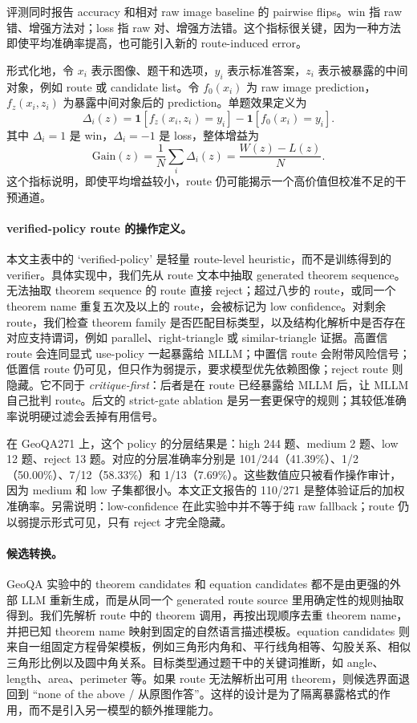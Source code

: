 \documentclass[UTF8,11pt,fontset=fandol]{ctexart}
\begin{document}
评测同时报告 accuracy 和相对 raw image baseline 的 pairwise flips。win 指 raw 错、增强方法对；loss 指 raw 对、增强方法错。这个指标很关键，因为一种方法即使平均准确率提高，也可能引入新的 route-induced error。

形式化地，令 \(x_i\) 表示图像、题干和选项，\(y_i\) 表示标准答案，\(z_i\) 表示被暴露的中间对象，例如 route 或 candidate list。令 \(f_0(x_i)\) 为 raw image prediction，\(f_z(x_i,z_i)\) 为暴露中间对象后的 prediction。单题效果定义为
\begin{equation}
\Delta_i(z)=
\mathbf{1}[f_z(x_i,z_i)=y_i]-
\mathbf{1}[f_0(x_i)=y_i].
\end{equation}
其中 \(\Delta_i=1\) 是 win，\(\Delta_i=-1\) 是 loss，整体增益为
\begin{equation}
\mathrm{Gain}(z)=\frac{1}{N}\sum_i \Delta_i(z)=\frac{W(z)-L(z)}{N}.
\end{equation}
这个指标说明，即使平均增益较小，route 仍可能揭示一个高价值但校准不足的干预通道。

\paragraph{verified-policy route 的操作定义。}
本文主表中的 `verified-policy' 是轻量 route-level heuristic，而不是训练得到的 verifier。具体实现中，我们先从 route 文本中抽取 generated theorem sequence。无法抽取 theorem sequence 的 route 直接 reject；超过八步的 route，或同一个 theorem name 重复五次及以上的 route，会被标记为 low confidence。对剩余 route，我们检查 theorem family 是否匹配目标类型，以及结构化解析中是否存在对应支持谓词，例如 parallel、right-triangle 或 similar-triangle 证据。高置信 route 会连同显式 use-policy 一起暴露给 MLLM；中置信 route 会附带风险信号；低置信 route 仍可见，但只作为弱提示，要求模型优先依赖图像；reject route 则隐藏。它不同于 \emph{critique-first}：后者是在 route 已经暴露给 MLLM 后，让 MLLM 自己批判 route。后文的 strict-gate ablation 是另一套更保守的规则；其较低准确率说明硬过滤会丢掉有用信号。

在 GeoQA271 上，这个 policy 的分层结果是：high 244 题、medium 2 题、low 12 题、reject 13 题。对应的分层准确率分别是 101/244（41.39\%）、1/2（50.00\%）、7/12（58.33\%）和 1/13（7.69\%）。这些数值应只被看作操作审计，因为 medium 和 low 子集都很小。本文正文报告的 110/271 是整体验证后的加权准确率。另需说明：low-confidence 在此实验中并不等于纯 raw fallback；route 仍以弱提示形式可见，只有 reject 才完全隐藏。

\paragraph{候选转换。}
GeoQA 实验中的 theorem candidates 和 equation candidates 都不是由更强的外部 LLM 重新生成，而是从同一个 generated route source 里用确定性的规则抽取得到。我们先解析 route 中的 theorem 调用，再按出现顺序去重 theorem name，并把已知 theorem name 映射到固定的自然语言描述模板。equation candidates 则来自一组固定方程骨架模板，例如三角形内角和、平行线角相等、勾股关系、相似三角形比例以及圆中角关系。目标类型通过题干中的关键词推断，如 angle、length、area、perimeter 等。如果 route 无法解析出可用 theorem，则候选界面退回到 “none of the above / 从原图作答”。这样的设计是为了隔离暴露格式的作用，而不是引入另一模型的额外推理能力。
\end{document}
